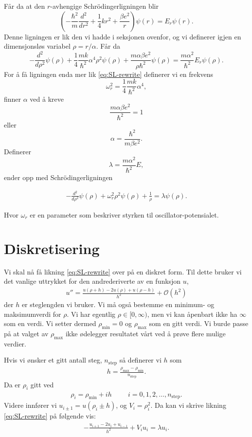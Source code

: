 \documentclass[11pt]{article}
\begin{document}
Får da at den $r$-avhengige Schr\"odingerligningen blir
\[
\left(  -\frac{\hbar^2}{m} \frac{d^2}{dr^2}+ \frac{1}{4}k r^2+\frac{\beta e^2}{r}\right)\psi(r)  = E_r \psi(r).
\]
Denne ligningen er lik den vi hadde i seksjonen ovenfor, og vi definerer
igjen en dimensjonsløs variabel $\rho = r/\alpha$. Får da
\[
  -\frac{d^2}{d\rho^2} \psi(\rho) 
       + \frac{1}{4}\frac{mk}{\hbar^2} \alpha^4\rho^2\psi(\rho)+\frac{m\alpha \beta e^2}{\rho\hbar^2}\psi(\rho)  = 
\frac{m\alpha^2}{\hbar^2}E_r \psi(\rho) .
\]
For å få ligningen enda mer lik \eqref{eq:SL-rewrite} definerer vi en frekvens
\[
\omega_r^2=\frac{1}{4}\frac{mk}{\hbar^2} \alpha^4,
\]
finner $\alpha$ ved å kreve
\[
\frac{m\alpha \beta e^2}{\hbar^2}=1
\]
eller
\[
\alpha = \frac{\hbar^2}{m\beta e^2}.
\]
Definerer 
\[
\lambda = \frac{m\alpha^2}{\hbar^2}E,
\]
ender opp med Schr\"odingerligningen

\begin{align}
  -\frac{d^2}{d\rho^2} \psi(\rho) + \omega_r^2\rho^2\psi(\rho) +\frac{1}{\rho} = \lambda \psi(\rho).\label{eq:SL-rewrite2}
\end{align}


Hvor $\omega_r$ er en parameter som beskriver styrken til 
oscillator-potensialet.

\section{Diskretisering}
Vi skal nå få likning \eqref{eq:SL-rewrite} over på en diskret
form. Til dette bruker vi det vanlige uttrykket for den andrederiverte
av en funksjon $u$, 
\begin{align*}
  u'' = \frac{ u(\rho + h) - 2u(\rho) + u(\rho-h) }{ h^2 } + \mathcal{O}(h^2)
\end{align*}
der $h$ er steglengden vi bruker. Vi må også bestemme en minimum- og
maksimumverdi for $\rho$. Vi har egentlig $\rho\in [0,\infty)$, men vi
kan åpenbart ikke ha $\infty$ som en verdi. Vi setter dermed
$\rho_\text{min} = 0$ og $\rho_\text{max}$ som en gitt verdi. Vi burde passe på
at valget av $\rho_\text{max}$ ikke ødelegger resultatet vårt ved å prøve
flere mulige verdier. 

Hvis vi ønsker et gitt antall steg, $n_\text{step}$ så definerer vi $h$ som
\begin{align}
  h = \frac{ \rho_\text{max} - \rho_\text{min} }{ n_\text{step} }.\label{eq:h-def}
\end{align}
Da er $\rho_i$ gitt ved
\begin{align*}
  \rho_i = \rho_\text{min} + ih\hspace{1cm} i=0,1,2,\dots,n_\text{step}.
\end{align*}
Videre innfører vi $u_{i\pm 1} = u(\rho_i \pm h)$, og $V_i =
\rho_i^2$. Da kan vi skrive likning \eqref{eq:SL-rewrite} på
følgende vis:
\begin{align*}
  -\frac{ u_{i+1} - 2u_i + u_{i-1} }{ h^2 } + V_iu_i = \lambda u_i.
\end{align*}
\end{document}
